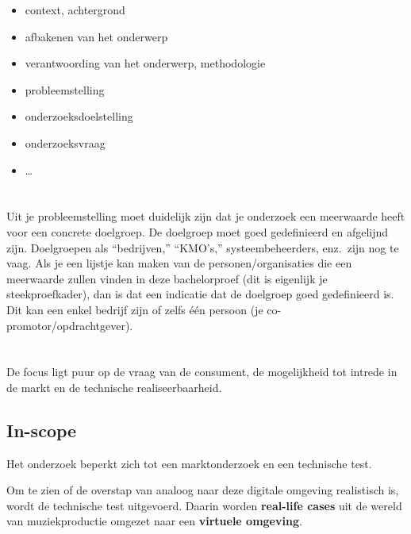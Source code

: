 \begin{itemize}
  \item context, achtergrond
  \item afbakenen van het onderwerp
  \item verantwoording van het onderwerp, methodologie
  \item probleemstelling
  \item onderzoeksdoelstelling
  \item onderzoeksvraag
  \item \ldots
\end{itemize}


\section{}
\label{sec:probleemstelling}

Uit je probleemstelling moet duidelijk zijn dat je onderzoek een meerwaarde heeft voor een concrete doelgroep. De doelgroep moet goed gedefinieerd en afgelijnd zijn. Doelgroepen als ``bedrijven,'' ``KMO's,'' systeembeheerders, enz.~zijn nog te vaag. Als je een lijstje kan maken van de personen/organisaties die een meerwaarde zullen vinden in deze bachelorproef (dit is eigenlijk je steekproefkader), dan is dat een indicatie dat de doelgroep goed gedefinieerd is. Dit kan een enkel bedrijf zijn of zelfs één persoon (je co-promotor/opdrachtgever).

\fi

\section{}
\label{sec:afbakening}

De focus ligt puur op de vraag van de consument, de mogelijkheid tot intrede in de markt en de technische realiseerbaarheid.

\subsection{In-scope}

Het onderzoek beperkt zich tot een marktonderzoek en een technische test.

Om te zien of de overstap van analoog naar deze digitale omgeving realistisch is, wordt de technische test uitgevoerd. Daarin worden \textbf{real-life cases} uit de wereld van muziekproductie omgezet naar een \textbf{virtuele omgeving}.

